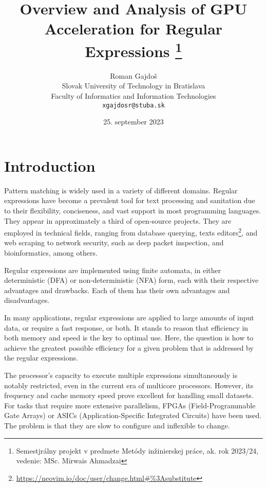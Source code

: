 \documentclass[10pt,onecolumn,twoside,english,a4paper]{article}
\title{Overview and Analysis of GPU Acceleration for Regular Expressions
\thanks{Semestjrálny projekt v predmete Metódy inžinierskej práce, ak. rok 2023/24, vedenie: MSc. Mirwais Ahmadzai}} %
\author{Roman Gajdoš\\[2pt]
	{\small Slovak University of Technology in Bratislava}\\
	{\small Faculty of Informatics and Information Technologies}\\
	{\small \texttt{xgajdosr@stuba.sk}}
	}
\date{\small 25. september 2023} %
\begin{document}
\maketitle

\begin{abstract}
	\blindtext[2]

\end{abstract}

\section{Introduction} \label{Introduction}
Pattern matching is widely used in a variety of different domains. Regular expressions have become a prevalent tool for text processing and sanitation due to their flexibility, conciseness, and vast support in most programming languages\cite{Chapman:Usage}. They appear in approximately a third of open-source projects\cite{Davis:Re-use}. They are employed in technical fields, ranging from database querying\cite{István:databases-regex}, texts editors\footnote{\url{https://neovim.io/doc/user/change.html\#\%3Asubstitute}}, and web scraping \cite{Gunawan2019/03} to network security, such as deep packet inspection\cite{becchi2008workload}, and bioinformatics\cite{prieto2014prediction,huang2008gpu}, among others.

Regular expressions are implemented using finite automata, in either deterministic (DFA) or non-deterministic (NFA) form, each with their respective advantages and drawbacks. Each of them has their own advantages and disadvantages\cite{Becchi:regex_large_dataset,Nourian:DemystifyingFSA,Zu:GPU-NFA}.

In many applications, regular expressions are applied to large amounts of input data, or require a fast response, or both. It stands to reason that efficiency in both memory and speed is the key to optimal use\cite{Xia:FSA-scaling}.
Here, the question is how to achieve the greatest possible efficiency for a given problem that is addressed by the regular expressions.

The processor's capacity to execute multiple expressions simultaneously is notably restricted, even in the current era of multicore processors\cite{Lee:myths}. However, its frequency and cache memory speed prove excellent for handling small datasets. For tasks that require more extensive parallelism, FPGAs (Field-Programmable Gate Arrays) or ASICs (Application-Specific Integrated Circuits) have been used. The problem is that they are slow to configure\cite{XU:regex_alg_slow} and inflexible to change\cite{fuchs2019accelerator,Liu:Asynchronous}.
\end{document}
